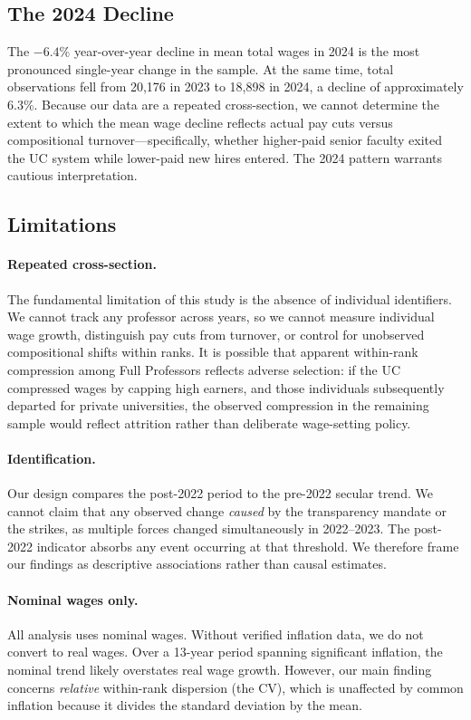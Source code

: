 \documentclass[12pt]{article}
\begin{document}
\subsection{The 2024 Decline}

The $-6.4\%$ year-over-year decline in mean total wages in 2024 is the
most pronounced single-year change in the sample. At the same time, total
observations fell from 20,176 in 2023 to 18,898 in 2024, a decline of
approximately 6.3\%. Because our data are a repeated cross-section, we
cannot determine the extent to which the mean wage decline reflects
actual pay cuts versus compositional turnover---specifically, whether
higher-paid senior faculty exited the UC system while lower-paid new
hires entered. The 2024 pattern warrants cautious interpretation.

\subsection{Limitations}

\paragraph{Repeated cross-section.} The fundamental limitation of this
study is the absence of individual identifiers. We cannot track any
professor across years, so we cannot measure individual wage growth,
distinguish pay cuts from turnover, or control for unobserved
compositional shifts within ranks. It is possible that apparent
within-rank compression among Full Professors reflects adverse selection:
if the UC compressed wages by capping high earners, and those
individuals subsequently departed for private universities, the observed
compression in the remaining sample would reflect attrition rather than
deliberate wage-setting policy.

\paragraph{Identification.} Our design compares the post-2022 period to
the pre-2022 secular trend. We cannot claim that any observed change
\emph{caused} by the transparency mandate or the strikes, as multiple
forces changed simultaneously in 2022--2023. The post-2022 indicator
absorbs any event occurring at that threshold. We therefore frame our
findings as descriptive associations rather than causal estimates.

\paragraph{Nominal wages only.} All analysis uses nominal wages. Without
verified inflation data, we do not convert to real wages. Over a 13-year
period spanning significant inflation, the nominal trend likely
overstates real wage growth. However, our main finding concerns
\emph{relative} within-rank dispersion (the CV), which is unaffected by
common inflation because it divides the standard deviation by the mean.
\end{document}
